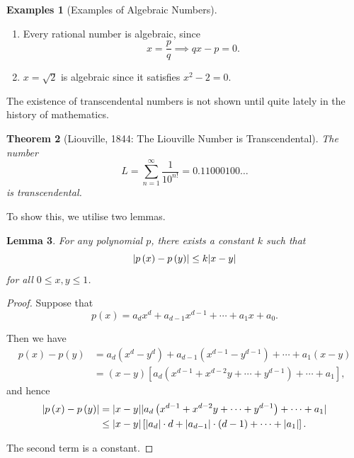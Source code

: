 \documentclass{article}
\newtheorem{theorem}{Theorem}[section]
\newtheorem{lemma}[theorem]{Lemma}
\theoremstyle{definition}
\newtheorem{examples}[theorem]{Examples}
\theoremstyle{remark}
\DeclarePairedDelimiter{\abs}{\lvert}{\rvert}
\newcommand{\pqty}[1]{\left(#1\right)}
\newcommand{\bqty}[1]{\left[#1\right]}
\begin{document}
\begin{examples}[Examples of Algebraic Numbers]
    \begin{enumerate}
        \item Every rational number is algebraic, since
        \[
            x = \frac{p}{q} \implies qx - p = 0.
        \]

        \item \(x = \sqrt{2}\) is algebraic since it satisfies \(x^2 - 2 = 0\).
    \end{enumerate}
\end{examples}

The existence of transcendental numbers is not shown until quite lately in the history of mathematics.

\begin{theorem}[Liouville, 1844: The Liouville Number is Transcendental]
    The number
    \[
        L = \sum_{n = 1}^{\infty} \frac{1}{10^{n!}} = 0.11000100\ldots
    \]
    is transcendental.
\end{theorem}

To show this, we utilise two lemmas.

\begin{lemma}
    For any polynomial \(p\), there exists a constant \(k\) such that
    \[
        \abs{p\pqty{x} - p\pqty{y}} \leq k \abs{x - y}
    \]
    for all \(0 \leq x, y \leq 1\).
\end{lemma}

\begin{proof}
    Suppose that
    \[
        p\pqty{x} = a_d x^d + a_{d - 1} x^{d - 1} + \cdots + a_1 x + a_0.
    \]

    Then we have
    \begin{align*}
        p\pqty{x} - p\pqty{y} &= a_d \pqty{x^d - y^d} + a_{d - 1} \pqty{x^{d - 1} - y^{d - 1}} + \cdots + a_1 \pqty{x - y} \\
        &= \pqty{x - y} \bqty{a_d \pqty{x^{d - 1} + x^{d - 2} y + \cdots + y^{d - 1}} + \cdots + a_1},
    \end{align*}
    and hence
    \begin{align*}
        \abs{p \pqty{x} - p \pqty{y}} &= \abs{x - y} \abs{a_d \pqty{x^{d - 1} + x^{d - 2} y + \cdots + y^{d - 1}} + \cdots + a_1} \\
        &\leq \abs{x - y} \bqty{\abs{a_d} \cdot d + \abs{a_{d - 1}} \cdot \pqty{d - 1} + \cdots + \abs{a_1}}.
    \end{align*}

    The second term is a constant.
\end{proof}
\end{document}
